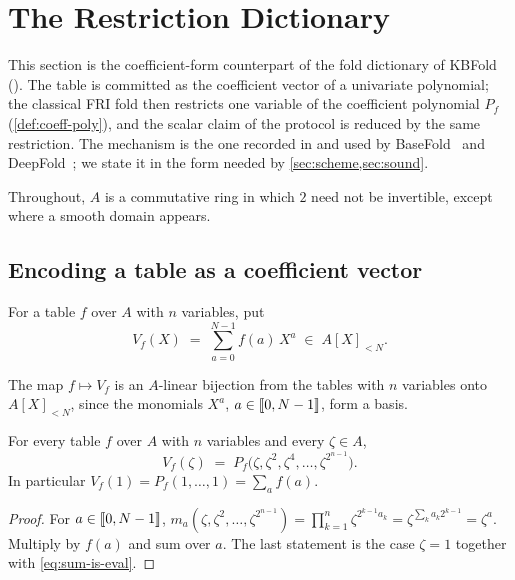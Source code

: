 \section{The Restriction Dictionary}\label{sec:restriction}

This section is the coefficient-form counterpart of the fold dictionary of KBFold ().
The table is committed as the coefficient vector of a univariate polynomial; the classical FRI fold then restricts one variable of the coefficient polynomial $P_f$ (\cref{def:coeff-poly}), and the scalar claim of the protocol is reduced by the same restriction.
The mechanism is the one recorded in  and used by BaseFold~\cite{ZCF24} and DeepFold~\cite{GLHQTZ25}; we state it in the form needed by \cref{sec:scheme,sec:sound}.

Throughout, $A$ is a commutative ring in which $2$ need not be invertible, except where a smooth domain appears.

\subsection{Encoding a table as a coefficient vector}\label{sec:restriction:enc}

\begin{definition}\label{def:vf}
For a table $f$ over $A$ with $n$ variables, put
\[
  V_f(X) \;=\; \sum_{a=0}^{N-1} f(a)\, X^{a} \;\in\; A[X]_{<N}.
\]
\end{definition}

The map $f \mapsto V_f$ is an $A$-linear bijection from the tables with $n$ variables onto $A[X]_{<N}$, since the monomials $X^a$, $a \in \llbracket 0, N-1 \rrbracket$, form a basis.

\begin{lemma}\label{lem:kronecker}
For every table $f$ over $A$ with $n$ variables and every $\zeta \in A$,
\[
  V_f(\zeta) \;=\; P_f\bigl(\zeta, \zeta^{2}, \zeta^{4}, \dots, \zeta^{2^{n-1}}\bigr).
\]
In particular $V_f(1) = P_f(1,\dots,1) = \sum_a f(a)$.
\end{lemma}

\begin{proof}
For $a \in \llbracket 0, N-1 \rrbracket$, $m_a(\zeta,\zeta^2,\dots,\zeta^{2^{n-1}}) = \prod_{k=1}^n \zeta^{2^{k-1} a_k} = \zeta^{\sum_k a_k 2^{k-1}} = \zeta^a$.
Multiply by $f(a)$ and sum over $a$. The last statement is the case $\zeta = 1$ together with \eqref{eq:sum-is-eval}.
\end{proof}

